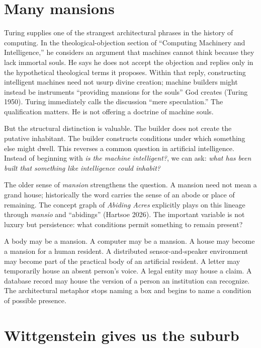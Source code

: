 \documentclass[11pt]{article}
\begin{document}
\section{Many mansions}

Turing supplies one of the strangest architectural phrases in the history of computing. In the theological-objection section of ``Computing Machinery and Intelligence,'' he considers an argument that machines cannot think because they lack immortal souls. He says he does not accept the objection and replies only in the hypothetical theological terms it proposes. Within that reply, constructing intelligent machines need not usurp divine creation; machine builders might instead be instruments ``providing mansions for the souls'' God creates (Turing 1950). Turing immediately calls the discussion ``mere speculation.'' The qualification matters. He is not offering a doctrine of machine souls.

But the structural distinction is valuable. The builder does not create the putative inhabitant. The builder constructs conditions under which something else might dwell. This reverses a common question in artificial intelligence. Instead of beginning with \emph{is the machine intelligent?}, we can ask: \emph{what has been built that something like intelligence could inhabit?}

The older sense of \emph{mansion} strengthens the question. A mansion need not mean a grand house; historically the word carries the sense of an abode or place of remaining. The concept graph of \emph{Abiding Acres} explicitly plays on this lineage through \emph{mansio} and ``abidings'' (Hartsoe 2026). The important variable is not luxury but persistence: what conditions permit something to remain present?

A body may be a mansion. A computer may be a mansion. A house may become a mansion for a human resident. A distributed sensor-and-speaker environment may become part of the practical body of an artificial resident. A letter may temporarily house an absent person's voice. A legal entity may house a claim. A database record may house the version of a person an institution can recognize. The architectural metaphor stops naming a box and begins to name a condition of possible presence.

\section{Wittgenstein gives us the suburb}
\end{document}
